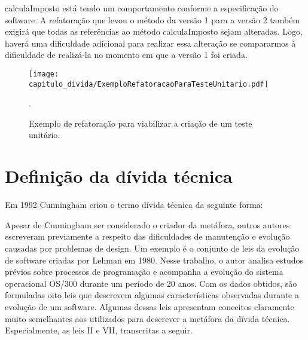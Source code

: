 calculaImposto está tendo um comportamento conforme a especificação do software. A refatoração que levou o método da versão 1 para a versão 2 também exigirá que todas as referências ao método calculaImposto sejam alteradas. Logo, haverá uma dificuldade adicional para realizar essa alteração se compararmos à dificuldade de realizá-la no momento em que a versão 1 foi criada. 
 
 
  \begin{figure}[H]
  \centering
  \texttt{[image: capitulo\_divida/ExemploRefatoracaoParaTesteUnitario.pdf]} 
  \caption{Exemplo de refatoração para viabilizar a criação de um teste unitário. }.
  \label{fig:cap1_exemplo_refatoracao_teste_unitario} 
\end{figure}








\section{Definição da dívida técnica}
\label{definicao_divida_tecnica}

Em 1992 Cunningham\cite{cunningham1993wycash} criou o termo dívida técnica da seguinte forma:
 



Apesar de Cunningham ser considerado o criador da metáfora, outros autores escreveram previamente a respeito das dificuldades de manutenção e evolução causadas por problemas de design. Um exemplo é o conjunto de leis da evolução de software criadas por Lehman \cite{lehman1980programs,lehman1996laws} em 1980. Nesse trabalho, o autor analisa estudos prévios sobre processos de programação e acompanha a evolução  do  sistema operacional OS/300 durante um período de 20 anos. Com os dados obtidos, são formuladas oito leis que descrevem algumas características observadas durante a evolução de um software. Algumas dessas leis apresentam conceitos claramente muito semelhantes aos utilizados para descrever a metáfora da dívida técnica. Especialmente, as leis II e VII, transcritas a seguir.

